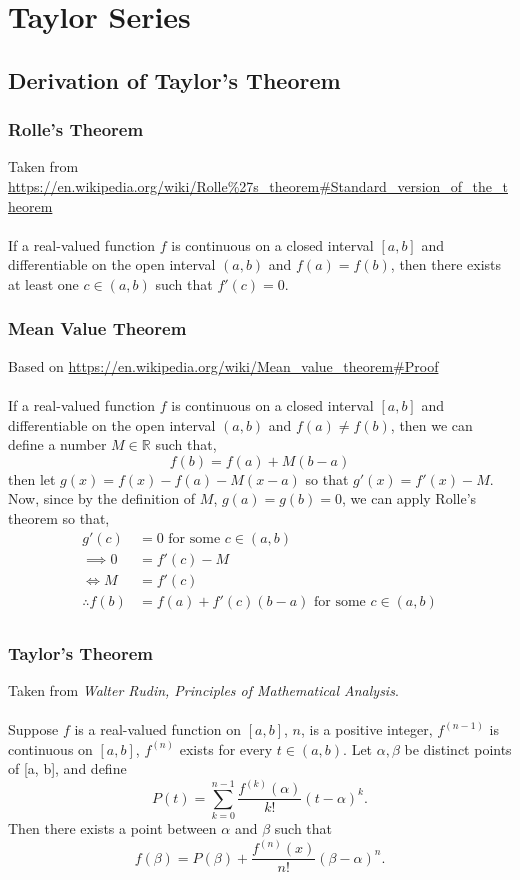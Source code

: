 \documentclass[MathsNotesBase.tex]{subfiles}
\date{\vspace{-6ex}}
\begin{document}
\chapter*{Taylor Series}

\section*{Derivation of Taylor's Theorem}
\bigskip

	\subsection*{Rolle's Theorem}
	Taken from \url{https://en.wikipedia.org/wiki/Rolle%27s_theorem#Standard_version_of_the_theorem}\\\\
	If a real-valued function $f$ is continuous on a closed interval $[a, b]$ and differentiable on the open interval $(a, b)$ and $f(a) = f(b)$, then there exists at least one $c \in (a, b)$ such that $f'(c) = 0$.
	
	\subsection*{Mean Value Theorem}
	Based on \url{https://en.wikipedia.org/wiki/Mean_value_theorem#Proof} \\\\
	If a real-valued function $f$ is continuous on a closed interval $[a, b]$ and differentiable on the open interval $(a, b)$ and $f(a) \neq f(b)$, then we can define a number $M \in \mathbb{R}$ such that,
	\[f(b) = f(a) + M(b-a)\]
	then let $g(x) = f(x) - f(a) - M(x - a)$ so that $g'(x) = f'(x) - M$. Now, since by the definition of $M$, $g(a) = g(b) = 0$, we can apply Rolle's theorem so that,
	\begin{align*}
	g'(c) &= 0 \text{ for some } c \in (a, b) \\
	\implies 0 &= f'(c) - M \\
	\iff M &= f'(c) \\
	\therefore f(b) &= f(a) + f'(c)(b - a) \text{ for some } c \in (a, b) \\
	\end{align*}
	
	\subsection*{Taylor's Theorem}
	Taken from \textit{Walter Rudin, Principles of Mathematical Analysis}.\\\\
	Suppose $f$ is a real-valued function on $[a, b]$, $n$, is a positive integer, $f^(n-1)$ is continuous on $[a, b]$, $f^(n)$ exists for every $t \in (a, b)$. Let $\alpha, \beta$ be distinct points of [a, b], and define
	\[ P(t) = \sum_{k = 0}^{n - 1}\frac{f^{(k)}(\alpha)}{k!}(t - \alpha)^k. \]
	Then there exists a point between $\alpha$ and $\beta$ such that
	\[ f(\beta) = P(\beta) + \frac{f^{(n)}(x)}{n!}(\beta - \alpha)^n. \]
	
\end{document}
